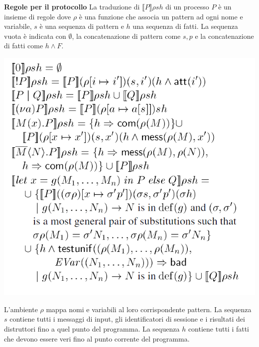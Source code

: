 \documentclass[12pt]{article}
\begin{document}
\textbf{Regole per il protocollo } La traduzione di $\llbracket P \rrbracket \rho sh$ di un processo $P$ è un insieme di regole dove $\rho$ è una funzione che associa un pattern ad ogni nome e variabile, $s$ è una sequenza di pattern e $h$ una sequenza di fatti. La sequenza vuota è indicata con $\emptyset$, la concatenazione di pattern come $s,p$ e la concatenazione di fatti come $h \land F$.\\
\begin{center}
    \includegraphics[scale=0.7]{Relazione/Immagini/semantic.PNG}
\end{center}
L'ambiente $\rho$ mappa nomi e variabili al loro corrispondente pattern. La sequenza $s$ contiene tutti i messaggi di input, gli identificatori di sessione e i risultati dei distruttori fino a quel punto del programma. La sequenza $h$ contiene tutti i fatti che devono essere veri fino al punto corrente del programma. 
\end{document}
